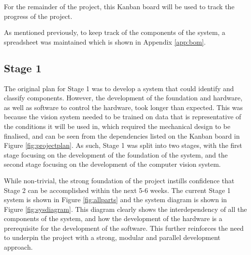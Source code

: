 For the remainder of the project, this Kanban board will be used to track the progress of the project. 

As mentioned previously, to keep track of the components of the system, a spreadsheet was maintained which is shown in Appendix \ref{app:bom}.
\subsection{Stage 1}
The original plan for Stage 1 was to develop a system that could identify and classify components. However, the development 
of the foundation and hardware, as well as software to control the hardware, took longer than expected. This was because
the vision system needed to be trained on data that is representative of the conditions it will be used in, which 
required the mechanical design to be finalised, and can be seen from the dependencies listed on the Kanban board in Figure \ref{fig:projectplan}.
As such, Stage 1 was split into two stages, with the first stage focusing on the development of the foundation of the system, and the second stage focusing on the development of the computer vision system.

While non-trivial, the strong foundation of the project instills confidence that Stage 2 can be accomplished within the next 5-6 weeks.
The current Stage 1 system is shown in Figure \ref{fig:allparts} and the system diagram is shown in Figure \ref{fig:sysdiagram}.
This diagram clearly shows the interdependency of all the components of the system, and how the development of the hardware is a prerequisite for the development of the software.
This further reinforces the need to underpin the project with a strong, modular and parallel development approach.

